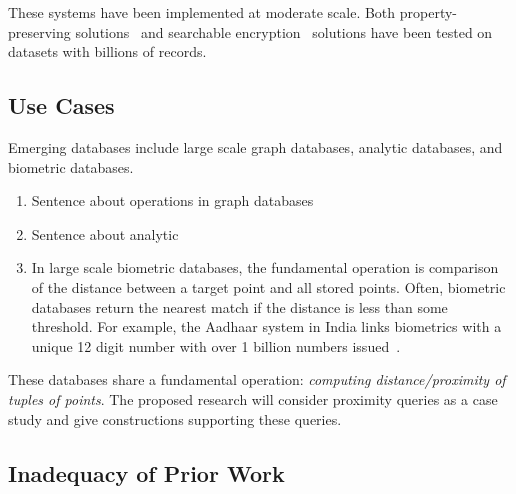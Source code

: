 These systems have been implemented at moderate scale.  Both property-preserving solutions~\cite{EPRINT:PodBoePop16,CACM:PRZB12} and searchable encryption~\cite{SP:PKVKMC14,SP:FVKKKM15,C:CJJKRS13,CCS:JJKRS13,NDSS:CJJJKR14,ESORICS:FJKNRS15,RSA:IKLO16} solutions have been tested on datasets with billions of records.

%


\subsection{Use Cases}
Emerging databases include large scale graph databases, analytic databases, and
biometric databases. 
\begin{enumerate}
\item Sentence about operations in graph databases
\item Sentence about analytic
\item In large scale biometric databases, the fundamental operation is comparison of the distance between a target point and all stored points. Often, biometric databases return the nearest match if the distance is less than some threshold.  For example, the Aadhaar system in India links biometrics with a unique 12 digit number with over 1 billion numbers issued~\cite{daugman2014600}.
\end{enumerate}

These databases share a fundamental operation: {\em
computing distance/proximity of tuples of points}. The proposed research will
consider proximity queries as a case study and give constructions supporting
these queries. 


\subsection{Inadequacy of Prior Work}


